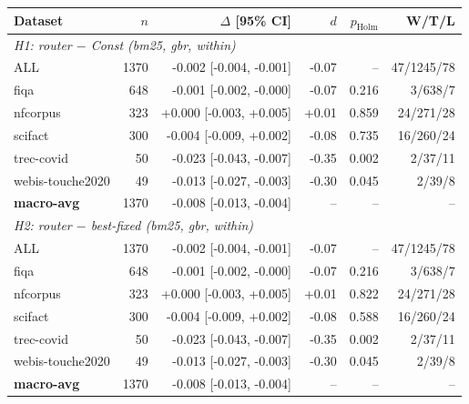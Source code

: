 \begin{tabular}{lrrrrr}
\hline
Dataset & $n$ & $\Delta$ [95\% CI] & $d$ & $p_{\mathrm{Holm}}$ & W/T/L \\
\hline
\multicolumn{6}{l}{\textit{H1: router $-$ Const (bm25, gbr, within)}} \\
ALL & 1370 & -0.002 [-0.004, -0.001] & -0.07 & -- & 47/1245/78 \\
fiqa & 648 & -0.001 [-0.002, -0.000] & -0.07 & 0.216 & 3/638/7 \\
nfcorpus & 323 & +0.000 [-0.003, +0.005] & +0.01 & 0.859 & 24/271/28 \\
scifact & 300 & -0.004 [-0.009, +0.002] & -0.08 & 0.735 & 16/260/24 \\
trec-covid & 50 & -0.023 [-0.043, -0.007] & -0.35 & 0.002 & 2/37/11 \\
webis-touche2020 & 49 & -0.013 [-0.027, -0.003] & -0.30 & 0.045 & 2/39/8 \\
\textbf{macro-avg} & 1370 & -0.008 [-0.013, -0.004] & -- & -- & -- \\
\hline
\multicolumn{6}{l}{\textit{H2: router $-$ best-fixed (bm25, gbr, within)}} \\
ALL & 1370 & -0.002 [-0.004, -0.001] & -0.07 & -- & 47/1245/78 \\
fiqa & 648 & -0.001 [-0.002, -0.000] & -0.07 & 0.216 & 3/638/7 \\
nfcorpus & 323 & +0.000 [-0.003, +0.005] & +0.01 & 0.822 & 24/271/28 \\
scifact & 300 & -0.004 [-0.009, +0.002] & -0.08 & 0.588 & 16/260/24 \\
trec-covid & 50 & -0.023 [-0.043, -0.007] & -0.35 & 0.002 & 2/37/11 \\
webis-touche2020 & 49 & -0.013 [-0.027, -0.003] & -0.30 & 0.045 & 2/39/8 \\
\textbf{macro-avg} & 1370 & -0.008 [-0.013, -0.004] & -- & -- & -- \\
\hline
\end{tabular}